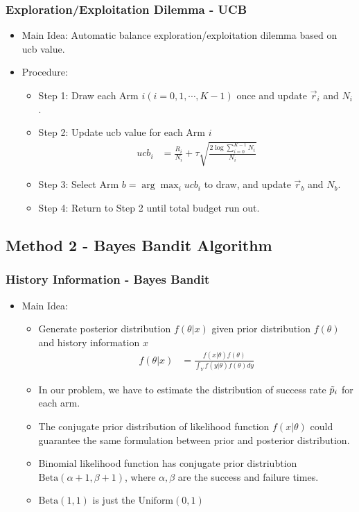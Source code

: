 \documentclass[compress]{beamer}
\begin{document}
\begin{frame}
\frametitle{Exploration/Exploitation Dilemma - UCB}
\begin{itemize}
  \item Main Idea: Automatic balance exploration/exploitation dilemma based on ucb value. 
  \item Procedure:
    \begin{itemize}
      \item Step 1: Draw each Arm $i (i = 0, 1, \cdots, K-1)$ once and update $\vec r_{i}$ and $N_{i}$.
      \item Step 2: Update ucb value for each Arm $i$
                    \begin{align}
                      ucb_{i} & = \frac{R_{i}}{N_{i}} + \tau \sqrt{\frac{2 \log \sum_{i=0}^{K-1} N_{i}}{N_{i}}}
                    \end{align}
      \item Step 3: Select Arm $b = \arg \max_{i} ucb_{i}$ to draw, and update $\vec r_{b}$ and $N_{b}$.
      \item Step 4: Return to Step 2 until total budget run out.
    \end{itemize}
\end{itemize}
\end{frame}

\subsection{Method 2 - Bayes Bandit Algorithm}

\begin{frame}
\frametitle{History Information - Bayes Bandit}
\begin{itemize}
  \item Main Idea:
    \begin{itemize}
      \item Generate posterior distribution $f(\theta | x)$ given prior distribution $f(\theta)$ and history information $x$
            \begin{align}
              f(\theta | x) & = \frac{f(x | \theta) f(\theta)}{\int_{Y} f(y | \theta) f(\theta) dy }
            \end{align}
      \item In our problem, we have to estimate the distribution of success rate $\Tilde p_{i}$ for each arm.            
      \item The conjugate prior distribution of likelihood function $f(x | \theta)$ could guarantee the same formulation between prior and posterior distribution.
      \item Binomial likelihood function has conjugate prior distriubtion $\mbox{Beta}(\alpha + 1, \beta + 1)$, where $\alpha, \beta$ are the success and failure times.
      \item $\mbox{Beta}(1,1)$ is just the $\mbox{Uniform}(0,1)$
    \end{itemize}
\end{itemize}
\end{frame}
\end{document}
